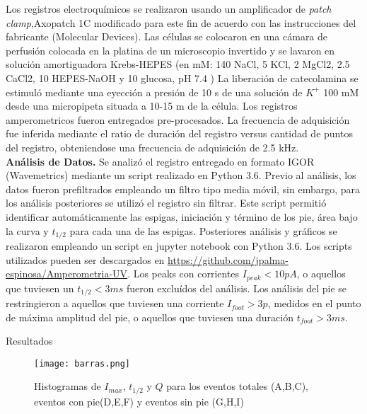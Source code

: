 \documentclass[twocolumn]{article}
\makeatletter
\def\section{\@startsection {section}{1}{\z@}{24pt plus 2pt minus 2pt}
{12pt plus 2pt minus 2pt}{\large\bf}}
\makeatother
\begin{document}
Los registros electroquímicos se realizaron usando un amplificador de \textit{patch clamp},Axopatch 1C modificado para este fin de acuerdo con las instrucciones del fabricante (Molecular Devices). Las células se colocaron en una cámara de perfusión colocada en la platina de un microscopio invertido y se lavaron en solución amortiguadora Krebs-HEPES (en mM: 140 NaCl, 5 KCl, 2 MgCl2, 2.5 CaCl2, 10 HEPES-NaOH y 10 glucosa, pH 7.4 ) La liberación de catecolamina se estimuló mediante una eyección a presión de 10 s de una solución de $K^+$  100 mM desde una micropipeta situada a 10-15 m de la célula.
Los registros amperometricos fueron entregados pre-procesados. La frecuencia de adquisición fue inferida mediante el ratio de duración del registro versus cantidad de puntos del registro, obteniendose una frecuencia de adquisición de 2.5 kHz. \\
{\bf Análisis de Datos.} Se analizó el registro entregado en formato IGOR (Wavemetrics) mediante un script realizado en Python 3.6.  Previo al análisis, los datos fueron prefiltrados empleando un filtro tipo media móvil, sin embargo, para los análisis posteriores se utilizó el registro sin filtrar. Este script permitió identificar automáticamente las espigas, iniciación y término de los pie, área bajo la curva y $t_{1/2}$ para cada una de las espigas.  Posteriores análisis y gráficos se realizaron empleando un script en jupyter notebook con Python 3.6.  Los scripts utilizados pueden ser descargados en \url{https://github.com/jpalma-espinosa/Amperometria-UV}.
Los peaks con corrientes $I_{peak}<10 pA$, o aquellos que tuviesen un $t_{1/2}<3ms$ fueron excluídos del análisis. Los análisis del pie se restringieron a aquellos que tuviesen una corriente $I_{foot}>3p$, medidos en el punto de máxima amplitud del pie, o aquellos que tuviesen una duración $t_{foot}>3ms$.
\section{Resultados}

\begin{figure*}[h!]
\centering
\texttt{[image: barras.png]} 
\caption{Histogramas de $I_{max}$, $t_{1/2}$ y $Q$ para los eventos totales (A,B,C), eventos con pie(D,E,F) y eventos sin pie (G,H,I)}
\label{fig:barras}
\end{figure*}
\end{document}
